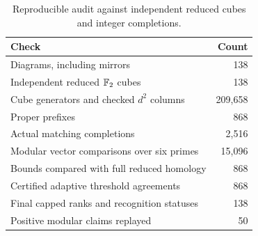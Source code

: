 \begin{table}[htbp]
\centering\small
\caption{Reproducible audit against independent reduced cubes and integer completions.}
\label{tab:audit}
\begin{tabular}{@{}lr@{}}
\toprule
Check & Count\\
\midrule
Diagrams, including mirrors & 138\\
Independent reduced $\mathbb F_2$ cubes & 138\\
Cube generators and checked $d^2$ columns & 209,658\\
Proper prefixes & 868\\
Actual matching completions & 2,516\\
Modular vector comparisons over six primes & 15,096\\
Bounds compared with full reduced homology & 868\\
Certified adaptive threshold agreements & 868\\
Final capped ranks and recognition statuses & 138\\
Positive modular claims replayed & 50\\
\bottomrule
\end{tabular}
\end{table}
